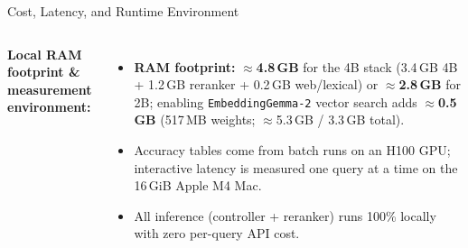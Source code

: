 \documentclass[aspectratio=1610,11pt]{beamer}
\begin{document}
\begin{frame}{Cost, Latency, and Runtime Environment}
\begin{columns}[T]
    \footnotesize
    \textbf{Local RAM footprint \& measurement environment:}
    \begin{itemize}\footnotesize
      \item \textbf{RAM footprint:} $\approx$\textbf{4.8\,GB} for the 4B stack (3.4\,GB 4B + 1.2\,GB reranker + 0.2\,GB web/lexical) or $\approx$\textbf{2.8\,GB} for 2B; enabling \texttt{EmbeddingGemma-2} vector search adds $\approx$\textbf{0.5\,GB} (517\,MB weights; $\approx$5.3\,GB / 3.3\,GB total).
      \item Accuracy tables come from batch runs on an H100 GPU; interactive latency is measured one query at a time on the 16\,GiB Apple M4 Mac.
      \item All inference (controller + reranker) runs 100\% locally with zero per-query API cost.
    \end{itemize}
  \end{columns}
\end{frame}
\end{document}
